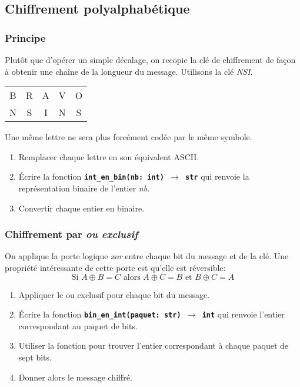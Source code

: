 \documentclass[a4paper,11pt]{article}
\begin{document}
\subsection{Chiffrement polyalphabétique}
\subsubsection{Principe}
Plutôt que d'opérer un simple décalage, on recopie la clé de chiffrement de façon à obtenir une chaîne de la longueur du message. Utilisons la clé \emph{NSI}.
\begin{center}
    \begin{tabular}{*{5}{c}}
        B&R&A&V&O\\
        N&S&I&N&S\\
    \end{tabular}
\end{center}
Une même lettre ne sera plus forcément codée par le même symbole.
\begin{activite}
\begin{enumerate}
    \item Remplacer chaque lettre en son équivalent ASCII.
    \item Écrire la fonction \textbf{\texttt{int\_en\_bin(nb: int) $\rightarrow$ str}} qui renvoie la représentation binaire de l'entier \emph{nb}.
    \item Convertir chaque entier en binaire.
\end{enumerate}
\end{activite}
\subsubsection{Chiffrement par \emph{ou exclusif}}
On applique la porte logique \emph{xor} entre chaque bit du message et de la clé. Une propriété intéressante de cette porte est qu'elle est réversible:
$$\mbox{Si }A\oplus B = C \mbox{ alors } A\oplus C=B \mbox{ et }B\oplus C=A$$
\begin{activite}
\begin{enumerate}
    \item Appliquer le ou exclusif pour chaque bit du message.
    \item Écrire la fonction \textbf{\texttt{bin\_en\_int(paquet: str) $\rightarrow$ int}} qui renvoie l'entier correspondant au paquet de bits.
    \item Utiliser la fonction pour trouver l'entier correspondant à chaque paquet de sept bits.
    \item Donner alors le message chiffré.
\end{enumerate}
\end{activite}
\end{document}

